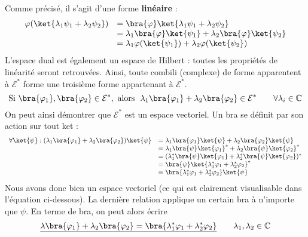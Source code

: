 Comme précisé, il s'agit d'une forme \textbf{linéaire} :
\begin{equation}
\begin{array}{ll}
\varphi(\ket{\lambda_1\psi_1+\lambda_2\psi_2}) &= \bra{\varphi}\ket{\lambda_1\psi_1+\lambda_2\psi_2}\\
&= \lambda_1\bra{\varphi}\ket{\psi_1}+\lambda_2\bra{\varphi}\ket{\psi_2}\\
&= \lambda_1\varphi(\ket{\psi_1})+\lambda_2\varphi(\ket{\psi_2})
\end{array}
\end{equation}
L'espace dual est également un espace de Hilbert : toutes les propriétés de 
linéarité seront retrouvées. Ainsi, toute combili (complexe) de forme 
apparentent à $\mathcal{E}^*$ forme une troisième forme appartenant à 
$\mathcal{E}^*$.
\begin{equation}
\text{Si } \bra{\varphi_1},\bra{\varphi_2}\in\mathcal{E}^*, \text{ alors }\ 
\lambda_1\bra{\varphi_1} + \lambda_2\bra{\varphi_2} \in\mathcal{E}^*\qquad 
\forall \lambda_i\in\mathbb{C}
\end{equation}
On peut ainsi démontrer que $\mathcal{E}^*$ est un espace vectoriel.
Un bra se définit par son action sur tout ket :
\begin{equation}
\begin{array}{ll}
\forall \ket{\psi} : (\lambda_1\bra{\varphi_1} + \lambda_2\bra{\varphi_2})\ket{\psi} 
&= \lambda_1\bra{\varphi_1}\ket{\psi}+\lambda_2\bra{\varphi_2}\ket{\psi} \\
&= \lambda_1\bra{\psi}\ket{\varphi_1}^*+\lambda_2\bra{\psi}\ket{\varphi_2}^*\\
&= (\lambda_1^*\bra{\psi}\ket{\varphi_1}+\lambda_2^*\bra{\psi}\ket{\varphi_2})^*\\
&= \bra{\psi}\ket{\lambda_1^*\varphi_1+\lambda_2^*\varphi_2}^*\\
&= \bra{\lambda_1^*\varphi_1+\lambda_2^*\varphi_2}\ket{\psi}
\end{array}
\end{equation}
Nous avons donc bien un espace vectoriel (ce qui est clairement visualisable 
dans l'équation ci-dessous). La dernière relation applique un certain bra à 
n'importe que $\psi$. En terme de bra, on peut alors écrire
\begin{equation}
\underline{\lambda\bra{\varphi_1} + \lambda_2\bra{\varphi_2} = \bra{\lambda_1^*\varphi_1
+\lambda_2^*\varphi_2}}\qquad \lambda_1,\lambda_2\in\mathbb{C}
\end{equation}


